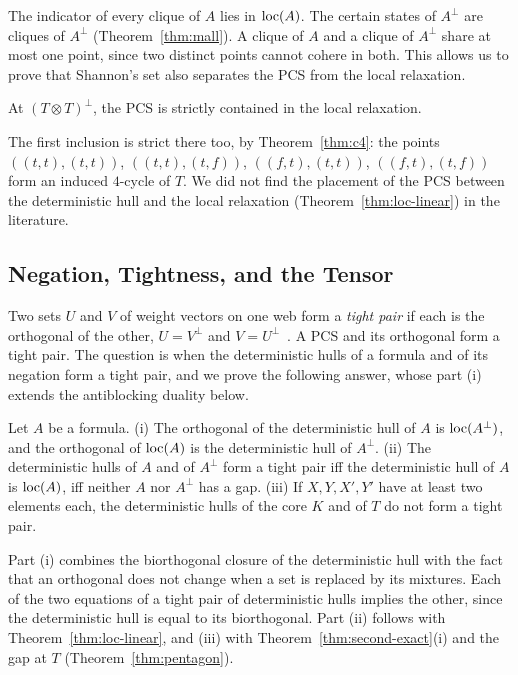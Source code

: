The indicator of every clique of $A$ lies in $\mathrm{loc}(A)$. The certain
states of $A^{\perp}$ are cliques of $A^{\perp}$ (Theorem~\ref{thm:mall}). A clique of $A$ and a
clique of $A^{\perp}$ share at most one point,
since two distinct points cannot cohere in both. This allows us to prove
that Shannon's set also separates the PCS from the local
relaxation.

\begin{corollary}
\label{cor:tt}
At $(T \otimes T)^{\perp}$, the PCS is strictly contained in
the local relaxation.
\end{corollary}

\noindent
The first inclusion is strict there too, by Theorem~\ref{thm:c4}: the
points $((t,t),(t,t))$, $((t,t),(t,f))$, $((f,t),(t,t))$, $((f,t),(t,f))$
form an induced $4$-cycle of $T$.
We did not find the placement of the PCS between the
deterministic hull and the local relaxation
(Theorem~\ref{thm:loc-linear}) in the literature.

\subsection{Negation, Tightness, and the Tensor}
\label{sec:duality-tight}

Two sets $U$ and $V$ of weight vectors on one web form a \emph{tight
pair} if each is the orthogonal of the other, $U = V^{\perp}$ and
$V = U^{\perp}$~\cite{hyland-schalk2003}. A PCS and its
orthogonal form a tight pair. The question is when the deterministic hulls of a formula and of its negation form a tight
pair, and we prove the following answer, whose part (i) extends the
antiblocking duality below.

\begin{theorem}
\label{thm:duality}
Let $A$ be a formula.
(i) The orthogonal of the deterministic hull of $A$ is $\mathrm{loc}(A^{\perp})$, and the
orthogonal of $\mathrm{loc}(A)$ is the deterministic hull of $A^{\perp}$.
(ii) The deterministic hulls of $A$ and of $A^{\perp}$ form a tight pair iff the
deterministic hull of $A$ is $\mathrm{loc}(A)$, iff neither $A$ nor $A^{\perp}$ has a gap.
(iii) If $X, Y, X', Y'$ have at least two elements each, the deterministic hulls of
the core $K$ and of $T$ do not form a tight pair.
\end{theorem}

\noindent
Part (i) combines the biorthogonal closure of the deterministic hull with the fact
that an orthogonal does not change when a set is replaced by its
mixtures. Each of the two equations of a tight pair of deterministic hulls implies the
other, since the deterministic hull is equal to its biorthogonal. Part (ii) follows
with Theorem~\ref{thm:loc-linear}, and (iii)
with Theorem~\ref{thm:second-exact}(i) and the gap at $T$
(Theorem~\ref{thm:pentagon}).

